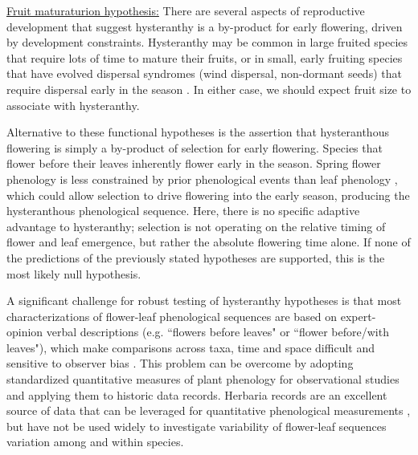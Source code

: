 \documentclass{article}[11pt]
\begin{document}
\underline{Fruit maturaturion hypothesis:} There are several aspects of reproductive development that suggest hysteranthy is a by-product for early flowering, driven by development constraints. Hysteranthy may be common in large fruited species that require lots of time to mature their fruits, or in small, early fruiting species that have evolved dispersal syndromes (wind dispersal, non-dormant seeds) that require dispersal early in the season \citep{Primack1987}. In either case, we should expect fruit size to associate with hysteranthy.

Alternative to these functional hypotheses is the assertion that hysteranthous flowering is simply a by-product of selection for early flowering. Species that flower before their leaves inherently flower early in the season. Spring flower phenology is less constrained by prior phenological events than leaf phenology \citep{Savage2019}, which could allow selection to drive flowering into the early season, producing the hysteranthous phenological sequence. Here, there is no specific adaptive advantage to hysteranthy;  selection is not operating on the relative timing of flower and leaf emergence, but rather the absolute flowering time alone. If none of the predictions of the previously stated hypotheses are supported, this is the most likely null hypothesis.

\noindent A significant challenge for robust testing of hysteranthy hypotheses is that most characterizations of flower-leaf phenological sequences are based on expert-opinion verbal descriptions (e.g. ``flowers before leaves" or ``flower before/with leaves"), which make comparisons across taxa, time and space difficult and sensitive to observer bias  \citep[see;][]{Buonaiuto2020}. This problem can be overcome by adopting standardized quantitative measures of plant phenology for observational studies and applying them to historic data records. Herbaria records are an excellent source of data that can be leveraged for quantitative phenological measurements \citep{Willis2017}, but have not be used widely to investigate variability of flower-leaf sequences variation among and within species.
\end{document}
